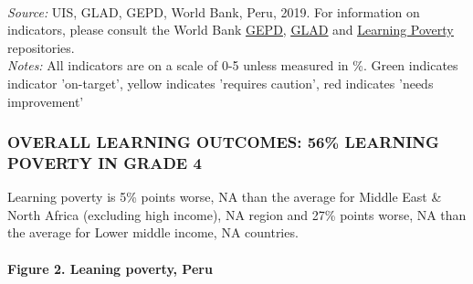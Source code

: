\documentclass[twocolumn]{article}
\let\oldparagraph\paragraph
\renewcommand{\paragraph}[1]{\oldparagraph{#1}\mbox{}}
\begin{document}
\begin{table}[H]
\\
\color{darkgray}\scriptsize{\textit{Source:} UIS, GLAD, GEPD, World Bank, Peru, 2019. For information on indicators, please consult the World Bank \href{https://github.com/worldbank/GEPD}{\underline{GEPD}}, \href{https://github.com/worldbank/GLAD}{\underline{GLAD}} and \href{https://github.com/worldbank/LearningPoverty}{\underline{Learning Poverty}} repositories.}\\
\color{darkgray}\scriptsize{\textit{Notes:} All indicators are on a scale of 0-5 unless measured in \%. Green indicates indicator 'on-target', yellow indicates 'requires caution', red indicates 'needs improvement'}
\end{table}
\raggedbottom

\hypertarget{overall-learning-outcomes-56-learning-poverty-in-grade-4}{%
\subsubsection{\texorpdfstring{\textbf{OVERALL LEARNING OUTCOMES: 56\%
LEARNING POVERTY IN GRADE
4}}{OVERALL LEARNING OUTCOMES: 56\% LEARNING POVERTY IN GRADE 4}}\label{overall-learning-outcomes-56-learning-poverty-in-grade-4}}

Learning poverty is 5\% points worse, NA than the average for Middle
East \& North Africa (excluding high income), NA region and 27\% points
worse, NA than the average for Lower middle income, NA countries.

\hypertarget{figure-2.-leaning-poverty-peru}{%
\paragraph{Figure 2. Leaning poverty,
Peru}\label{figure-2.-leaning-poverty-peru}}
\end{document}
